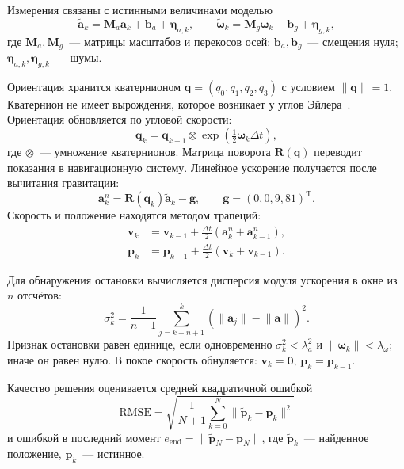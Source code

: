 \documentclass{misisarticle}
\begin{document}
Измерения связаны с истинными величинами моделью
\begin{equation}
\tilde{\mathbf a}_k=\mathbf M_a\mathbf a_k+\mathbf b_a+\boldsymbol\eta_{a,k},\qquad
\tilde{\boldsymbol\omega}_k=\mathbf M_g\boldsymbol\omega_k+\mathbf b_g+\boldsymbol\eta_{g,k},
\label{eq:model}
\end{equation}
где $\mathbf M_a,\mathbf M_g$~--- матрицы масштабов и перекосов осей; $\mathbf b_a,\mathbf b_g$~--- смещения нуля; $\boldsymbol\eta_{a,k},\boldsymbol\eta_{g,k}$~--- шумы.

Ориентация хранится кватернионом $\mathbf q=(q_0,q_1,q_2,q_3)$ с условием $\|\mathbf q\|=1$. Кватернион не имеет вырождения, которое возникает у углов Эйлера~\cite{zhilin}. Ориентация обновляется по угловой скорости:
\begin{equation}
\mathbf q_k=\mathbf q_{k-1}\otimes\exp\!\left(\tfrac12\boldsymbol\omega_k\Delta t\right),
\label{eq:quat}
\end{equation}
где $\otimes$~--- умножение кватернионов. Матрица поворота $\mathbf R(\mathbf q)$ переводит показания в навигационную систему. Линейное ускорение получается после вычитания гравитации:
\begin{equation}
\mathbf a_k^{n}=\mathbf R(\mathbf q_k)\tilde{\mathbf a}_k-\mathbf g,\qquad \mathbf g=(0,0,9{,}81)^\mathrm T.
\label{eq:lin}
\end{equation}
Скорость и положение находятся методом трапеций:
\begin{align}
\mathbf v_k&=\mathbf v_{k-1}+\tfrac{\Delta t}{2}\left(\mathbf a_k^{n}+\mathbf a_{k-1}^{n}\right),
\label{eq:v}\\
\mathbf p_k&=\mathbf p_{k-1}+\tfrac{\Delta t}{2}\left(\mathbf v_k+\mathbf v_{k-1}\right).
\label{eq:p}
\end{align}

Для обнаружения остановки вычисляется дисперсия модуля ускорения в окне из $n$ отсчётов:
\begin{equation}
\sigma_k^2=\frac{1}{n-1}\sum_{j=k-n+1}^{k}\left(\|\mathbf a_j\|-\overline{\|\mathbf a\|}\right)^2.
\label{eq:var}
\end{equation}
Признак остановки равен единице, если одновременно $\sigma_k^2<\lambda_a^2$ и $\|\boldsymbol\omega_k\|<\lambda_\omega$; иначе он равен нулю. В покое скорость обнуляется: $\mathbf v_k=\mathbf 0$, $\mathbf p_k=\mathbf p_{k-1}$.

Качество решения оценивается средней квадратичной ошибкой
\begin{equation}
\mathrm{RMSE}=\sqrt{\frac{1}{N+1}\sum_{k=0}^{N}\|\tilde{\mathbf p}_k-\mathbf p_k\|^2}
\label{eq:rmse}
\end{equation}
и ошибкой в последний момент $e_{\text{end}}=\|\tilde{\mathbf p}_N-\mathbf p_N\|$, где $\tilde{\mathbf p}_k$~--- найденное положение, $\mathbf p_k$~--- истинное.
\end{document}
